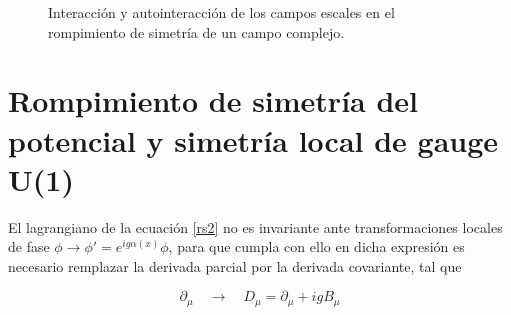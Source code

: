 \begin{figure}[!h]
\begin{subfigure}[b]{0.3\textwidth}
    \end{subfigure}
    \begin{subfigure}[b]{0.3\textwidth}
    \end{subfigure}
    \begin{subfigure}[b]{0.3\textwidth}
    \end{subfigure}
    \caption{Interacción y autointeracción de los campos escales en el rompimiento de simetría de un campo complejo.}
    \label{diag2}
\end{figure}

\section{Rompimiento de simetría del potencial y simetría local de gauge U(1)}

El lagrangiano de la ecuación \ref{rs2} no es invariante ante transformaciones locales de fase $\phi \rightarrow \phi'=e^{ig\alpha (x)}\phi$, para que cumpla con ello en dicha expresión es necesario remplazar la derivada parcial por la derivada covariante, tal que 

$$ \partial_{\mu} \quad \longrightarrow \quad D_{\mu} = \partial_{\mu} + igB_{\mu} $$

